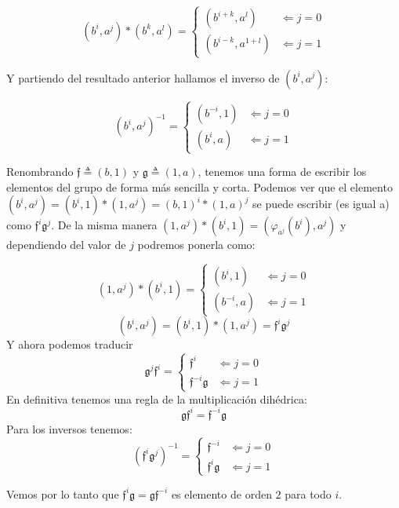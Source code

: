 \documentclass[12pt,a4paper,fleqn,spanish,final,openright]{extbook}
\theoremstyle{definition}
\theoremstyle{remark}
\begin{document}
\[
    (b^i,a^j)*(b^k,a^l) =
    \begin{cases}
        (b^{i+k},a^{l}) &    \Leftarrow    j = 0 \\
        (b^{i-k},a^{1+l})&    \Leftarrow    j = 1
    \end{cases}
\]

Y partiendo del resultado anterior hallamos el inverso de $(b^i,a^j)$:

\[
(b^i,a^j)^{-1} =
\begin{cases}
(b^{-i},1) &    \Leftarrow    j = 0 \\
(b^{i},a)&    \Leftarrow    j = 1
\end{cases}
\]

Renombrando $\mathfrak{f}\triangleq (b,1)$ y $\mathfrak{g}\triangleq (1,a)$, tenemos una forma de escribir los elementos del grupo de forma más sencilla y corta. Podemos ver que el elemento $(b^i,a^j)=(b^i,1)*(1,a^j)=(b,1)^i * (1,a)^j$ se puede escribir (es igual a) como $\mathfrak{f}^i \mathfrak{g}^j$. De la misma manera $(1,a^j)*(b^i,1)=(\varphi_{a^j}(b^i),a^j)$ y dependiendo del valor de $j$ podremos ponerla como:

\[
(1,a^j)*(b^i,1) =
\begin{cases}
(b^{i},1) &    \Leftarrow    j = 0 \\
(b^{-i},a)&    \Leftarrow    j = 1
\end{cases}
\]
\[
(b^i,a^j)=
(b^i,1)*(1,a^j)=
 \mathfrak{f}^i \mathfrak{g}^j
\]
Y ahora podemos traducir
\[
\mathfrak{g}^j \mathfrak{f}^i =
\begin{cases}
\mathfrak{f}^i &    \Leftarrow    j = 0 \\
\mathfrak{f}^{-i} \mathfrak{g}&    \Leftarrow    j = 1
\end{cases}
\]
En definitiva tenemos una regla de la multiplicación dihédrica:
\[
\mathfrak{g} \mathfrak{f}^i =
\mathfrak{f}^{-i} \mathfrak{g}
\]
Para los inversos tenemos:
\[
(\mathfrak{f}^i\mathfrak{g}^j)^{-1} =
\begin{cases}
\mathfrak{f}^{-i} &    \Leftarrow    j = 0 \\
\mathfrak{f}^{i} \mathfrak{g}&    \Leftarrow    j = 1
\end{cases}
\]

Vemos por lo tanto que $\mathfrak{f}^{i} \mathfrak{g} = \mathfrak{g} \mathfrak{f}^{-i}$ es elemento de orden $2$ para todo $i$.
\end{document}
